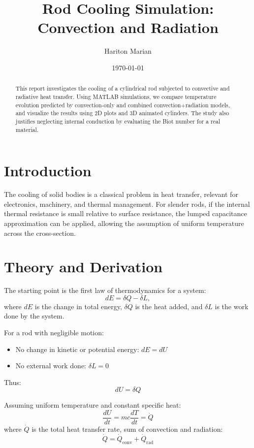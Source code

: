 \documentclass[12pt,a4paper]{article}
\title{Rod Cooling Simulation: Convection and Radiation}
\author{Hariton Marian}
\date{\today}
\begin{document}
\maketitle

\begin{abstract}
This report investigates the cooling of a cylindrical rod subjected to convective and radiative heat transfer. Using MATLAB simulations, we compare temperature evolution predicted by convection-only and combined convection+radiation models, and visualize the results using 2D plots and 3D animated cylinders. The study also justifies neglecting internal conduction by evaluating the Biot number for a real material.  
\end{abstract}

\section{Introduction}
The cooling of solid bodies is a classical problem in heat transfer, relevant for electronics, machinery, and thermal management. For slender rods, if the internal thermal resistance is small relative to surface resistance, the lumped capacitance approximation can be applied, allowing the assumption of uniform temperature across the cross-section.

\section{Theory and Derivation}
The starting point is the first law of thermodynamics for a system:
\begin{equation}
dE = \delta Q - \delta L,
\end{equation}
where \(dE\) is the change in total energy, \(\delta Q\) is the heat added, and \(\delta L\) is the work done by the system.

For a rod with negligible motion:
\begin{itemize}
\item No change in kinetic or potential energy: \(dE = dU\)
\item No external work done: \(\delta L = 0\)
\end{itemize}
Thus:
\begin{equation}
dU = \delta Q
\end{equation}

Assuming uniform temperature and constant specific heat:
\begin{equation}
\frac{dU}{dt} = mc \frac{dT}{dt} = \dot Q
\end{equation}
where \(\dot Q\) is the total heat transfer rate, sum of convection and radiation:
\begin{equation}
\dot Q = \dot Q_\text{conv} + \dot Q_\text{rad}
\end{equation}
\end{document}
